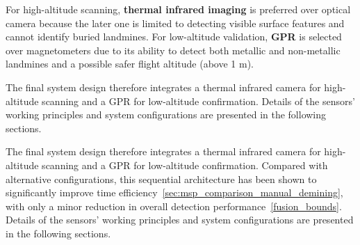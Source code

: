 For high-altitude scanning, \textbf{thermal infrared imaging} is preferred over optical camera because the later one is limited to detecting visible surface features and cannot identify buried landmines. For low-altitude validation, \textbf{GPR} is selected over magnetometers due to its ability to detect both metallic and non-metallic landmines and a possible safer flight altitude (above 1 m).

The final system design therefore integrates a thermal infrared camera for high-altitude scanning and a GPR for low-altitude confirmation. Details of the sensors' working principles and system configurations are presented in the following sections. 

The final system design therefore integrates a thermal infrared camera for high-altitude scanning and a GPR for low-altitude confirmation. Compared with alternative configurations, this sequential architecture has been shown to significantly improve time efficiency~\ref{sec:msp_comparison_manual_demining}, with only a minor reduction in overall detection performance~\ref{fusion_bounds}. Details of the sensors’ working principles and system configurations are presented in the following sections.